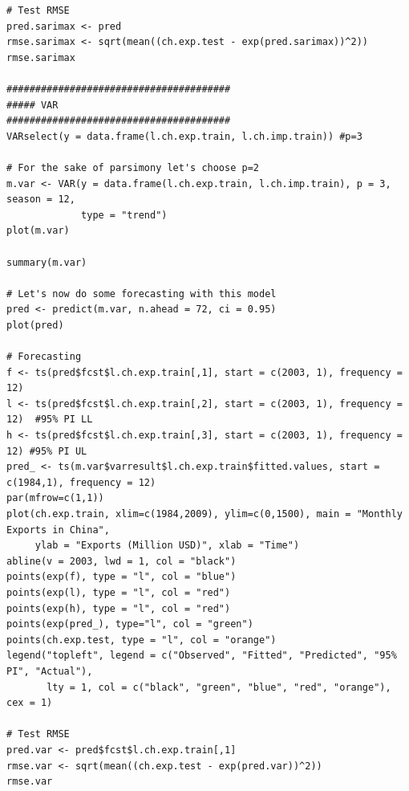 \documentclass[]{article}
\begin{document}
\begin{Verbatim}[frame=single]
# Test RMSE
pred.sarimax <- pred
rmse.sarimax <- sqrt(mean((ch.exp.test - exp(pred.sarimax))^2))
rmse.sarimax

#######################################
##### VAR
#######################################
VARselect(y = data.frame(l.ch.exp.train, l.ch.imp.train)) #p=3

# For the sake of parsimony let's choose p=2
m.var <- VAR(y = data.frame(l.ch.exp.train, l.ch.imp.train), p = 3, season = 12,
             type = "trend")
plot(m.var)

summary(m.var)

# Let's now do some forecasting with this model
pred <- predict(m.var, n.ahead = 72, ci = 0.95)
plot(pred)

# Forecasting
f <- ts(pred$fcst$l.ch.exp.train[,1], start = c(2003, 1), frequency = 12)
l <- ts(pred$fcst$l.ch.exp.train[,2], start = c(2003, 1), frequency = 12)  #95% PI LL
h <- ts(pred$fcst$l.ch.exp.train[,3], start = c(2003, 1), frequency = 12) #95% PI UL
pred_ <- ts(m.var$varresult$l.ch.exp.train$fitted.values, start = c(1984,1), frequency = 12)
par(mfrow=c(1,1))
plot(ch.exp.train, xlim=c(1984,2009), ylim=c(0,1500), main = "Monthly Exports in China",
     ylab = "Exports (Million USD)", xlab = "Time")
abline(v = 2003, lwd = 1, col = "black")
points(exp(f), type = "l", col = "blue")
points(exp(l), type = "l", col = "red")
points(exp(h), type = "l", col = "red")
points(exp(pred_), type="l", col = "green")
points(ch.exp.test, type = "l", col = "orange")
legend("topleft", legend = c("Observed", "Fitted", "Predicted", "95% PI", "Actual"),
       lty = 1, col = c("black", "green", "blue", "red", "orange"), cex = 1)

# Test RMSE
pred.var <- pred$fcst$l.ch.exp.train[,1]
rmse.var <- sqrt(mean((ch.exp.test - exp(pred.var))^2))
rmse.var

\end{Verbatim}
\end{document}
